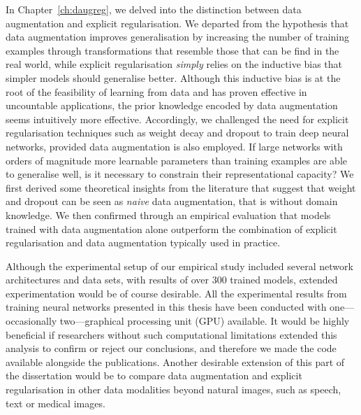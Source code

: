 {In Chapter~\ref{ch:daugreg}, we delved into the distinction between data augmentation and explicit regularisation. We departed from the hypothesis that data augmentation improves generalisation by increasing the number of training examples through transformations that resemble those that can be find in the real world, while explicit regularisation \textit{simply} relies on the inductive bias that simpler models should generalise better. Although this inductive bias is at the root of the feasibility of learning from data and has proven effective in uncountable applications, the prior knowledge encoded by data augmentation seems intuitively more effective. Accordingly, we challenged the need for explicit regularisation techniques such as weight decay and dropout to train deep neural networks, provided data augmentation is also employed. If large networks with orders of magnitude more learnable parameters than training examples are able to generalise well, is it necessary to constrain their representational capacity? We first derived some theoretical insights from the literature that suggest that weight and dropout can be seen as \textit{naive} data augmentation, that is without domain knowledge. We then confirmed through an empirical evaluation that models trained with data augmentation alone outperform the combination of explicit regularisation and data augmentation typically used in practice.

Although the experimental setup of our empirical study included several network architectures and data sets, with results of over 300 trained models, extended experimentation would be of course desirable. All the experimental results from training neural networks presented in this thesis have been conducted with one---occasionally two---graphical processing unit (GPU) available. It would be highly beneficial if researchers without such computational limitations extended this analysis to confirm or reject our conclusions, and therefore we made the code available alongside the publications. Another desirable extension of this part of the dissertation would be to compare data augmentation and explicit regularisation in other data modalities beyond natural images, such as speech, text or medical images.

}
